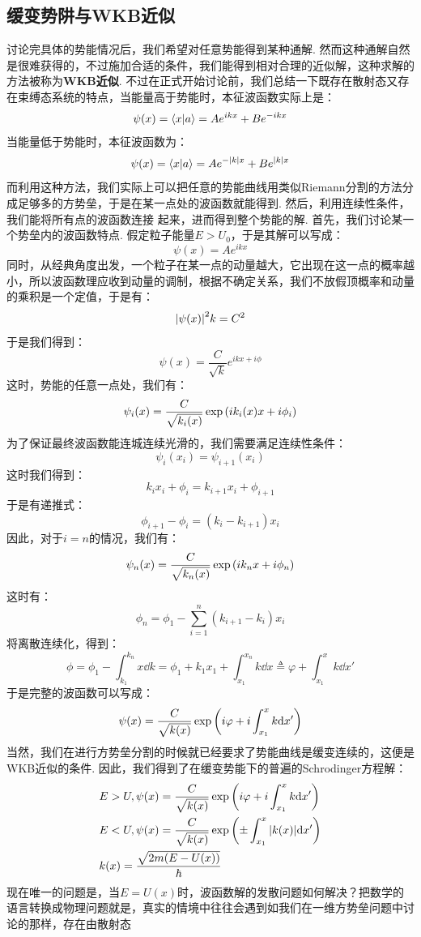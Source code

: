 \subsection{缓变势阱与WKB近似}
讨论完具体的势能情况后，我们希望对任意势能得到某种通解. 然而这种通解自然是很难获得的，不过施加合适的条件，我们能得到相对合理的近似解，这种求解的方法被称为\textbf{WKB近似}. 
不过在正式开始讨论前，我们总结一下既存在散射态又存在束缚态系统的特点，当能量高于势能时，本征波函数实际上是：
\[
\psi(x) = \bra{x}\ket{a} = Ae^{ikx} + Be^{-ikx}
\]
当能量低于势能时，本征波函数为：
\[
\psi(x) = \bra{x}\ket{a} = Ae^{-|k|x} + Be^{|k|x}
\]
而利用这种方法，我们实际上可以把任意的势能曲线用类似Riemann分割的方法分成足够多的方势垒，于是在某一点处的波函数就能得到. 然后，利用连续性条件，我们能将所有点的波函数连接
起来，进而得到整个势能的解. 首先，我们讨论某一个势垒内的波函数特点. 假定粒子能量\(E>U_{0}\)，于是其解可以写成：
\[
\psi(x) = Ae^{ikx}
\]
同时，从经典角度出发，一个粒子在某一点的动量越大，它出现在这一点的概率越小，所以波函数理应收到动量的调制，根据不确定关系，我们不放假顶概率和动量的乘积是一个定值，于是有：
\[
\abs{\psi(x)}^{2}k = C^{2}
\]
于是我们得到：
\[
\psi(x) = \frac{C}{\sqrt{k}}e^{ikx+i\phi}
\]
这时，势能的任意一点处，我们有：
\[
\psi_{i}(x) = \frac{C}{\sqrt{k_{i}(x)}}\exp\left({ik_{i}(x)x + i\phi_{i}}\right)
\]
为了保证最终波函数能连城连续光滑的，我们需要满足连续性条件：
\[
\psi_{i}(x_{i}) = \psi_{i+1}(x_{i})
\]
这时我们得到：
\[
k_{i}x_{i} + \phi_{i} = k_{i+1}x_{i} + \phi_{i+1}
\]
于是有递推式：
\[
\phi_{i+1} - \phi_{i} = (k_{i} - k_{i+1})x_{i}
\]
因此，对于\(i=n\)的情况，我们有：
\[
\psi_{n}(x) = \frac{C}{\sqrt{k_{n}(x)}}\exp\left({ik_{n}x + i\phi_{n}}\right)
\]
这时有：
\[
\phi_{n} = \phi_{1} - \sum_{i=1}^{n}(k_{i+1} - k_{i})x_{i}
\]
将离散连续化，得到：
\[
\phi = \phi_{1} - \int_{k_{1}}^{k_{n}}x\dd k = \phi_{1} + k_{1}x_{1} + \int_{x_{1}}^{x_{n}}k\dd x\triangleq \varphi + \int_{x_{1}}^{x}k\dd x'
\]
于是完整的波函数可以写成：
\[
\psi(x) = \frac{C}{\sqrt{k(x)}}\exp\left({i\varphi + i\int_{x_{1}}^{x}k\dd x'}\right)
\]
当然，我们在进行方势垒分割的时候就已经要求了势能曲线是缓变连续的，这便是WKB近似的条件. 因此，我们得到了在缓变势能下的普遍的Schrodinger方程解：
\begin{align*}
& E>U, \psi(x) = \frac{C}{\sqrt{k(x)}}\exp\left({i\varphi + i\int_{x_{1}}^{x}k\dd x'}\right) \\
& E<U, \psi(x) = \frac{C}{\sqrt{k(x)}}\exp\left({\pm\int_{x_{1}}^{x}\abs{k(x)}\dd x'}\right) \\
& k(x) = \frac{\sqrt{2m(E-U(x))}}{\hbar}
\end{align*}
现在唯一的问题是，当\(E=U(x)\)时，波函数解的发散问题如何解决？把数学的语言转换成物理问题就是，真实的情境中往往会遇到如我们在一维方势垒问题中讨论的那样，存在由散射态
